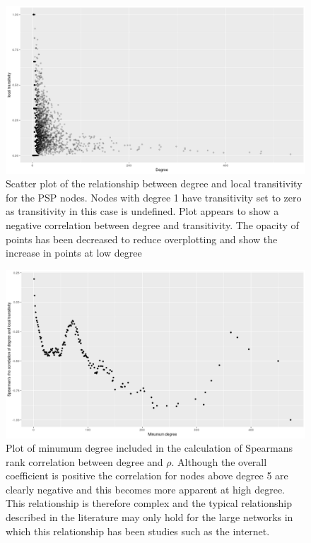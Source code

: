 \begin{figure}
    \centering
    \includegraphics[width=\textwidth]{images/Rplot02_degree_and_transitivity-change_alpha.png}
    \caption{Scatter plot of the relationship between degree and local transitivity for the PSP nodes. Nodes with degree 1 have transitivity set to zero as transitivity in this case is undefined. Plot appears to show a negative correlation between degree and transitivity. The opacity of points has been decreased to reduce overplotting and show the increase in points at low degree}
    \label{fig:Scatter plot of the relationship between degree and local transitivity for the PSP nodes}
\end{figure}
\begin{figure}
    \centering
    \includegraphics[width=\textwidth]{images/Rplot01_min_degree_transitivity.png}
    \caption{Plot of minumum degree included in the calculation of Spearmans rank correlation between degree and $\rho$. Although the overall coefficient is positive the correlation for nodes above degree 5 are clearly negative and this becomes more apparent at high degree. This relationship is therefore complex and the typical relationship described in the literature may only hold for the large networks in which this relationship has been studies such as the internet. }
    \label{fig:Plot of minumum degree included in the calculation of Spearmans rank correlation between degree and rho}
\end{figure}

